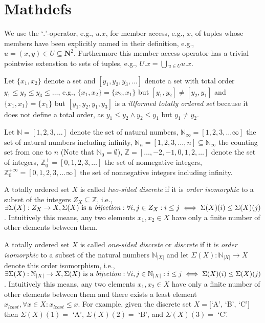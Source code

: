\section{Mathdefs}

We use the `$.$'-operator, e.g., $u.x$, for member access, e.g., $x$, of tuples whose members have been explicitly named in their definition, e.g., $u = (x, y) \in U \subseteq \mathbf{N}^2$.
Furthermore this member access operator has a trivial pointwise extenstion to sets of tuples, e.g., $U.x = \bigcup{}_{u \in U} u.x$.

Let $\{x_1,x_2\}$ denote a set and $[y_1,y_2,y_3,\ldots]$ denote a set
with total order $y_1 \le y_2 \le y_3 \le \ldots$, e.g., $\{x_1,x_2\} = \{x_2,x_1\}$ but
$[y_1,y_2] \ne [y_2,y_1]$ and $\{x_1,x_1\} = \{x_1\}$ but $[ y_1, y_2, y_1, y_3]$
is a \emph{illformed totally ordered set} because it does not define a total order,
as $y_1 \le y_2 \wedge y_2 \le y_1$ but $y_1 \ne y_2$.

Let $\mathbb{N} = [1,2,3,\ldots]$ denote the set of natural numbers,
$\mathbb{N}_\infty = [1,2,3,\ldots\infty]$ the set of natural numbers including infinity,
$\mathbb{N}_n = [1,2,3,\ldots,n] \subseteq \mathbb{N}_\infty$ the counting set from one to $n$ (Note that $\mathbb{N}_0 = \emptyset$),
$\mathbb{Z} = [\ldots,-2,-1,0,1,2,\ldots]$ denote the set of integers,
$\mathbb{Z}^+_0 = [0,1,2,3,\ldots]$ the set of nonnegative integers,
$\mathbb{Z}^{+\infty}_0 = [0,1,2,3,\ldots\infty]$ the set of nonnegative integers including infinity.

A totally ordered set $X$ is called \emph{two-sided discrete}
if it is \emph{order isomorphic} to a subset of the integers $Z_X \subseteq \mathbb{Z}$,
i.e., $\exists{\Sigma(X): Z_X \to X, \Sigma(X)\textrm{ is a \emph{bijection}}}:
 \forall{i,j \in Z_X}: i \le j \iff \Sigma(X)(i) \le \Sigma(X)(j)$.
Intuitively this means, any two elements
$x_1, x_2 \in X$ have only a finite number of other elements between them.

A totally ordered set $X$ is called \emph{one-sided discrete} or \emph{discrete}
if it is \emph{order isomorphic} to a subset of the natural numbers $\mathbb{N}_{|X|}$
and let $\Sigma(X): \mathbb{N}_{|X|} \to X$ denote this order isomorphism,
i.e., $\exists{\Sigma(X): \mathbb{N}_{|X|} \to X, \Sigma(X)\textrm{ is a \emph{bijection}}}:
 \forall{i,j \in \mathbb{N}_{|X|}}: i \le j \iff \Sigma(X)(i) \le \Sigma(X)(j)$.
Intuitively this means,
any two elements $x_1, x_2 \in X$ have only a finite number of other elements
between them and there exists a least element $x_{least}, \forall{x \in X}: x_{least} \le x$.
For example, given the discrete set $X = [$`A', `B', `C'$]$ then
$\Sigma(X)(1) =$ `A',  $\Sigma(X)(2) =$ `B', and $\Sigma(X)(3) =$ `C'.

